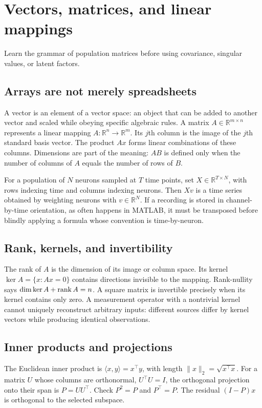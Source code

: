 \chapter{Vectors, matrices, and linear mappings}\label{ch:linear}
\begin{readergoal}Learn the grammar of population matrices before using covariance, singular values, or latent factors.\end{readergoal}
\section{Arrays are not merely spreadsheets}
A vector is an element of a vector space: an object that can be added to another vector and scaled while obeying specific algebraic rules. A matrix $A\in\mathbb R^{m\times n}$ represents a linear mapping $A:\mathbb R^n\to\mathbb R^m$. Its $j$th column is the image of the $j$th standard basis vector. The product $Ax$ forms linear combinations of these columns. Dimensions are part of the meaning: $AB$ is defined only when the number of columns of $A$ equals the number of rows of $B$.

For a population of $N$ neurons sampled at $T$ time points, set $X\in\mathbb R^{T\times N}$, with rows indexing time and columns indexing neurons. Then $Xv$ is a time series obtained by weighting neurons with $v\in\mathbb R^N$. If a recording is stored in channel-by-time orientation, as often happens in MATLAB, it must be transposed before blindly applying a formula whose convention is time-by-neuron.

\section{Rank, kernels, and invertibility}
The rank of $A$ is the dimension of its image or column space. Its kernel $\ker A=\{x:Ax=0\}$ contains directions invisible to the mapping. Rank-nullity says $\dim\ker A+\operatorname{rank} A=n$. A square matrix is invertible precisely when its kernel contains only zero. A measurement operator with a nontrivial kernel cannot uniquely reconstruct arbitrary inputs: different sources differ by kernel vectors while producing identical observations.

\section{Inner products and projections}
The Euclidean inner product is $\langle x,y\rangle=x^\top y$, with length $\|x\|_2=\sqrt{x^\top x}$. For a matrix $U$ whose columns are orthonormal, $U^\top U=I$, the orthogonal projection onto their span is $P=UU^\top$. Check $P^2=P$ and $P^\top=P$. The residual $(I-P)x$ is orthogonal to the selected subspace.

